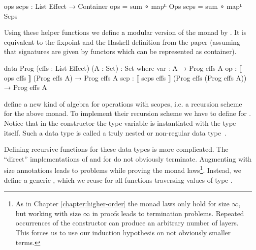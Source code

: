 \begin{code}
ops scps : List Effect → Container
ops   = sum ∘ mapᴸ Ops
scps  = sum ∘ mapᴸ Scps
\end{code}
Using these helper functions we define a modular version of the monad by
\textcite{DBLP:conf/lics/PirogSWJ18}.
It is equivalent to the fixpoint and the Haskell definition from the paper
(assuming that signatures are given by functors which can be represented as
container). %

\begin{code}
data Prog (effs : List Effect) (A : Set) : Set where
  var  :  A                                          → Prog effs A
  op   :  ⟦ ops   effs  ⟧ (Prog effs A)              → Prog effs A
  scp  :  ⟦ scps  effs  ⟧ (Prog effs (Prog effs A))  → Prog effs A
\end{code}
\textcite{DBLP:conf/lics/PirogSWJ18} define a new kind of algebra for operations
with scopes, i.e. a recursion scheme for the above monad.
To implement their recursion scheme we have to define \AgdaFunction{<\$>} for 
\AgdaSpace{}\AgdaSpace{}.
Notice that in the  constructor the type variable
 is instantiated with the type 
\AgdaSpace{}\AgdaSpace{}
itself.
Such a data type is called a truly nested or non-regular data
type~\cite{DBLP:conf/mpc/BirdM98}.

Defining recursive functions for these data types is more complicated.
The ``direct'' implementations of \AgdaFunction{<\$>} and \AgdaFunction{>>=} for
\AgdaSpace{}\AgdaSpace{}
do not obviously terminate.
Augmenting
\AgdaSpace{}\AgdaSpace{}
with size annotations leads to problems while
proving the monad laws\footnote{As in Chapter \ref{chapter:higher-order} the
  monad laws only hold for size $\infty$, but working with size $\infty$ in
  proofs leads to termination problems.
  Repeated occurrences of the  constructor can
  produce an arbitrary number of
  \AgdaSpace{} layers.
  This forces us to use our induction hypothesis on not obviously smaller
  terms.}.
Instead, we define a generic , which we reuse for all
functions traversing values of type
\AgdaSpace{}\AgdaSpace{}.


